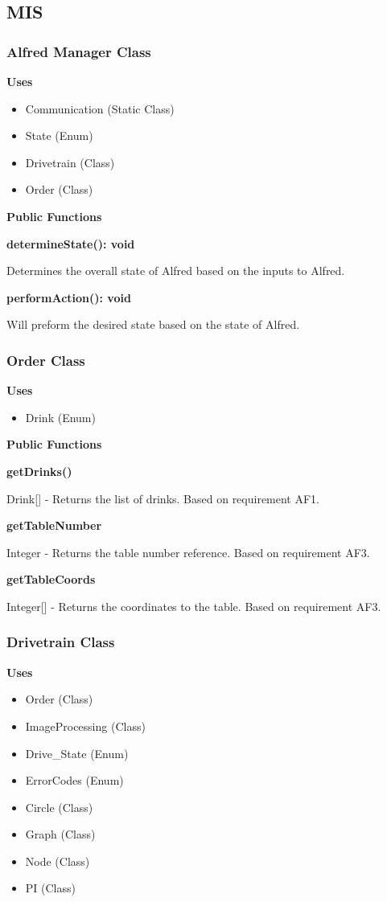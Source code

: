 \documentclass [10pt]{article}
\begin{document}
\subsection{MIS}

\subsubsection{Alfred Manager Class}

\textbf{Uses}
\begin{itemize}
	\item Communication (Static Class)
	\item State (Enum)
	\item Drivetrain (Class)
	\item Order (Class)
\end{itemize}



\textbf{Public Functions}

\textbf{determineState(): void}

Determines the overall state of Alfred based on the inputs to Alfred. 

\textbf{performAction(): void}

Will preform the desired state based on the state of Alfred.

\subsubsection{Order Class}
\textbf{Uses}
\begin{itemize}
	\item Drink (Enum)
\end{itemize}


\textbf{Public Functions}

\textbf{getDrinks()}

Drink[] - Returns the list of drinks. Based on requirement AF1.

\textbf{getTableNumber}

 Integer - Returns the table number reference. Based on requirement AF3.

\textbf{getTableCoords}

 Integer[] - Returns the coordinates to the table. Based on requirement AF3.

\subsubsection{Drivetrain Class}
\textbf{Uses}
\begin{itemize}
	\item Order (Class)
	\item ImageProcessing (Class)
	\item Drive\_State (Enum)
	\item ErrorCodes (Enum)
	\item Circle (Class)
	\item Graph (Class)
	\item Node (Class)
	\item PI (Class)
\end{itemize}
\end{document}
